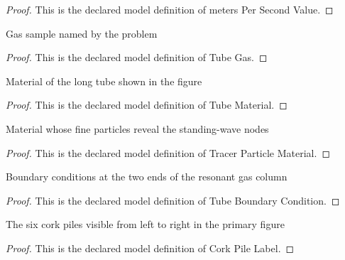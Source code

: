 \begin{proof}
  This is the declared model definition of meters Per Second Value.
\end{proof}
\begin{definition}
  \label{def:physics:phyx-mini-0183:phyxminiproblems-problemphyxmini0183-tubegas}
  Gas sample named by the problem
\end{definition}
\begin{proof}
  This is the declared model definition of Tube Gas.
\end{proof}
\begin{definition}
  \label{def:physics:phyx-mini-0183:phyxminiproblems-problemphyxmini0183-tubematerial}
  Material of the long tube shown in the figure
\end{definition}
\begin{proof}
  This is the declared model definition of Tube Material.
\end{proof}
\begin{definition}
  \label{def:physics:phyx-mini-0183:phyxminiproblems-problemphyxmini0183-tracerparticlematerial}
  Material whose fine particles reveal the standing-wave nodes
\end{definition}
\begin{proof}
  This is the declared model definition of Tracer Particle Material.
\end{proof}
\begin{definition}
  \label{def:physics:phyx-mini-0183:phyxminiproblems-problemphyxmini0183-tubeboundarycondition}
  Boundary conditions at the two ends of the resonant gas column
\end{definition}
\begin{proof}
  This is the declared model definition of Tube Boundary Condition.
\end{proof}
\begin{definition}
  \label{def:physics:phyx-mini-0183:phyxminiproblems-problemphyxmini0183-corkpilelabel}
  The six cork piles visible from left to right in the primary figure
\end{definition}
\begin{proof}
  This is the declared model definition of Cork Pile Label.
\end{proof}
